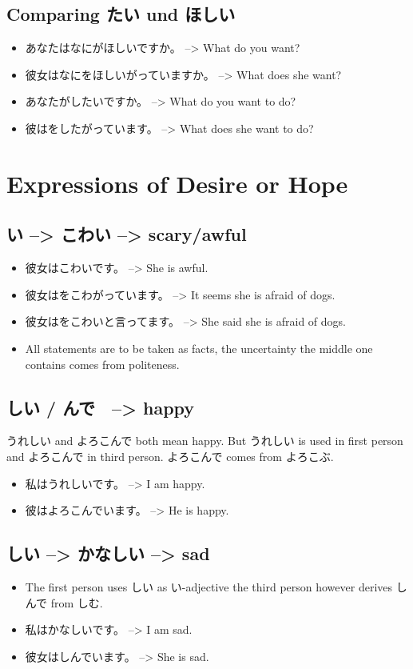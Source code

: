 \documentclass{article}
\begin{document}
\subsection{Comparing たい und ほしい}
\begin{itemize}
\item あなたはなにがほしいですか。 --> What do you want?
\item 彼女はなにをほしいがっていますか。 --> What does she want?
\item あなたがしたいですか。 --> What do you want to do?
\item 彼はをしたがっています。 --> What does she want to do?
\end{itemize}
\section{Expressions of Desire or Hope}
\subsection{い --> こわい --> scary/awful }
\begin{itemize}
\item 彼女はこわいです。 --> She is awful.
\item 彼女はをこわがっています。 --> It seems she is afraid of dogs.
\item 彼女はをこわいと言ってます。 --> She said she is afraid of dogs.
\item All statements are to be taken as facts, the uncertainty the middle one contains comes from politeness.
\end{itemize}
\subsection{しい / んで　--> happy}
うれしい and よろこんで both mean happy. But うれしい is used in first person and よろこんで in third person.
よろこんで comes from よろこぶ.
\begin{itemize}
\item 私はうれしいです。 --> I am happy.
\item 彼はよろこんでいます。 --> He is happy.
\end{itemize}
\subsection{しい --> かなしい --> sad }
\begin{itemize}
\item The first person uses しい as い-adjective the third person however derives しんで from しむ.
\item 私はかなしいです。 --> I am sad.
\item 彼女はしんでいます。 --> She is sad.
\end{itemize}
\end{document}
